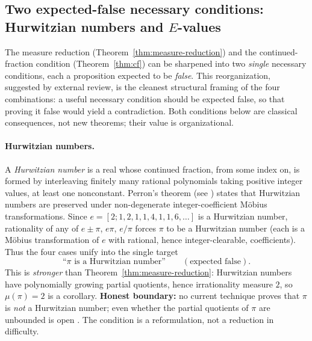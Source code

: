 \documentclass[11pt]{amsart}
\theoremstyle{definition}
\theoremstyle{remark}
\numberwithin{equation}{section}
\newcommand{\irr}{\mu}
\newcommand{\ee}{e}
\begin{document}
\subsection{Two expected-false necessary conditions: Hurwitzian numbers and \texorpdfstring{$E$}{E}-values}\label{sec:expected-false}

The measure reduction (Theorem~\ref{thm:measure-reduction}) and the continued-fraction condition (Theorem~\ref{thm:cf}) can be sharpened into two \emph{single} necessary conditions, each a proposition expected to be \emph{false}. This reorganization, suggested by external review, is the cleanest structural framing of the four combinations: a useful necessary condition should be expected false, so that proving it false would yield a contradiction. Both conditions below are classical consequences, not new theorems; their value is organizational.

\paragraph{Hurwitzian numbers.} A \emph{Hurwitzian number} is a real whose continued fraction, from some index on, is formed by interleaving finitely many rational polynomials taking positive integer values, at least one nonconstant. Perron's theorem (see \cite[p.~141]{Stambul}) states that Hurwitzian numbers are preserved under non-degenerate integer-coefficient M\"obius transformations. Since $\ee=[2;1,2,1,1,4,1,1,6,\dots]$ is a Hurwitzian number, rationality of any of $e\pm\pi$, $e\pi$, $e/\pi$ forces $\pi$ to be a Hurwitzian number (each is a M\"obius transformation of $e$ with rational, hence integer-clearable, coefficients). Thus the four cases unify into the single target
\[
\text{``$\pi$ is a Hurwitzian number''}\qquad(\text{expected false}).
\]
This is \emph{stronger} than Theorem~\ref{thm:measure-reduction}: Hurwitzian numbers have polynomially growing partial quotients, hence irrationality measure $2$, so $\irr(\pi)=2$ is a corollary. \textbf{Honest boundary:} no current technique proves that $\pi$ is \emph{not} a Hurwitzian number; even whether the partial quotients of $\pi$ are unbounded is open \cite{Hildebrand2024}. The condition is a reformulation, not a reduction in difficulty.
\end{document}
